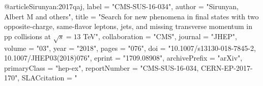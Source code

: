 @article{Sirunyan:2017qaj,
      label          = "CMS-SUS-16-034",
      author         = "Sirunyan, Albert M and others",
      title          = "{Search for new phenomena in final states with two
                        opposite-charge, same-flavor leptons, jets, and missing
                        transverse momentum in pp collisions at $ \sqrt{s}=13 $
                        TeV}",
      collaboration  = "CMS",
      journal        = "JHEP",
      volume         = "03",
      year           = "2018",
      pages          = "076",
      doi            = "10.1007/s13130-018-7845-2, 10.1007/JHEP03(2018)076",
      eprint         = "1709.08908",
      archivePrefix  = "arXiv",
      primaryClass   = "hep-ex",
      reportNumber   = "CMS-SUS-16-034, CERN-EP-2017-170",
      SLACcitation   = "%
}

